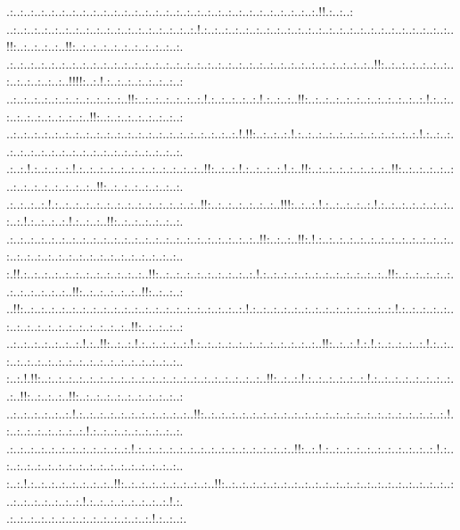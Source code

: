 \documentclass[paper=a4, fontsize=11pt]{scrartcl} %
\numberwithin{equation}{section} %
\numberwithin{figure}{section} %
\numberwithin{table}{section} %
\begin{document}
.:..:..:..:..:..:..:..:..:..:..:..:..:..:..:..:..:..:..:..:..:..:..:..:..:..:..:..:..:..:.!!.:..:..:\\..:..:..:..:..:..:..:..:..:..:..:..:..:..:..:..:..:..:.!.:..:..:..:..:..:..:..:..:..:..:..:..:..:..:..:..:..:..:..:..:..:..:..:..!!:..:..:..:..:..!!:..:..:..:..:..:..:..:..:..:..:.\\.:..:..:..:..:..:..:..:..:..:..:..:..:..:..:..:..:..:..:..:..:..:..:..:..:..:..:..:..:..:..:..:..:..:..:..!!:..:..:..:..:..:..:..:..:..:..:..:..:..!!!!:..:.!.:..:..:..:..:..:..:..:\\..:..:..:..:..:..:..:..:..:..:..:..!!:..:..:..:..:..:..:.!.:..:..:..:..:.!.:..:..:..!!:..:..:..:..:..:..:..:..:..:..:..:.!.:..:..:..:..:..:..:..:..:..:..!!:..:..:..:..:..:..:..:..:\\..:..:..:..:..:..:..:..:..:..:..:..:..:..:..:..:..:..:..:..:..:..:.!.!!:..:..:..:.!.:..:..:..:..:..:..:..:..:..:..:..:.!.:..:..:..:..:..:..:..:..:..:..:..:..:..:..:..:..:..:..:..:.\\.:..:.!.:..:..:..:.!.:..:..:..:..:..:..:..:..:..:..:..:..!!:..:..:.!.:..:..:..:.!.:..!!:..:..:..:..:..:..:..:..!!:..:..:..:..:..:..:..:..:..:..:..:..:..:..!!:..:..:..:..:..:..:..:.\\.:..:..:..:.!.:..:..:..:..:..:..:..:..:..:..:..:..:..:..!!:..:..:..:..:..:..:..!!!:..:..:.!.:..:..:..:..:.!.:..:..:..:..:..:..:..:..:.!.:..:..:..:.!.:..:..:..!!:..:..:..:..:..:..:.\\.:..:..:..:..:..:..:..:..:..:..:..:..:..:..:..:..:..:..:..:..:..:..:..:..!!:..:..:..!!:.!.:..:..:..:..:..:..:..:..:..:..:..:..:..:..:..:..:..:..:..:..:..:..:..:..:..:..:..:..:..:..\\:.!!.:..:..:..:..:..:..:..:..:..:..:..:..!!:..:..:..:..:..:..:..:..:..:.!.:..:..:..:..:..:..:..:..:..:..:..:..!!:..:..:..:..:..:..:..:..:..:..:..:..!!:..:..:..:..:..:..!!:..:..:..:\\..!!:..:..:..:..:..:..:..:..:..:..:..:..:..:..:..:..:..:..:..:..:..:.!.:..:..:..:..:..:..:..:..:..:..:..:..:..:.!.:..:..:..:..:..:..:..:..:..:..:..:..:..:..:..:..:..!!:..:..:..:..:\\..:..:..:..:..:..:..:.!.:..!!:..:..:.!.:..:..:..:..:.!.:..:..:..:..:..:..:..:..:..:..:..:..!!:..:..:.!.:.!.:..:..:..:..:.!.:..:..:..:..:..:..:..:..:..:..:..:..:..:..:..:..:..:..:..\\:..:.!.!!:..:..:..:..:..:..:..:..:..:..:..:..:..:..:..:..:..:..:..:..:..:..!!:..:..:.!.:..:..:..:..:..:.!.:..:..:..:..:..:..:..:..:..!!:..:..:..:..!!:..:..:..:..:..:..:..:..:..:..:\\..:..:..:..:..:..:.!.:..:..:..:..:..:..:..:..:..:..:..!!:..:..:..:..:..:..:..:..:..:..:..:..:..:..:..:..:..:..:..:..:..:..:..:.!.:..:..:..:..:..:..:..:.!.:..:..:..:..:..:..:..:..:.\\.:..:..:..:..:..:..:..:..:..:..:..:.!.:..:..:..:..:..:..:..:..:..:..:..:..:..:..:..!!:..:.!.:..:..:..:..:..:..:..:..:..:..:.!.:..:..:..:..:..:..:..:..:..:..:..:..:..:..:..:..:..:..\\:..:.!.:..:..:..:..:..:..:..:..!!:..:..:..:..:..:..:..:..:..!!:..:..:..:..:..:..:..:..:..:..:..:..:..:..:..:..:..:..:..:..:..:..:..:..:..:..:..:..:..:.!.:..:..:..:..:..:..:..:.!.:.\\.:..:..:..:..:..:..:..:..:..:..:..:..:..:.!.:..:..:.
\end{document}
